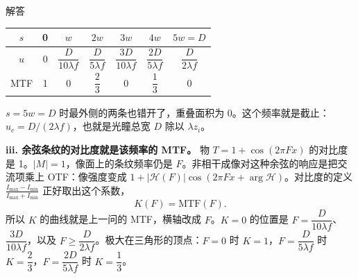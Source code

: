 \begin{exam}{解答}
\begin{center}\renewcommand{\arraystretch}{1.3}
\begin{tabular}{c|cccccc}
$s$ & 0 & $w$ & $2w$ & $3w$ & $4w$ & $5w=D$\\ \hline
$u$ & 0 & $\dfrac{D}{10\lambda f}$ & $\dfrac{D}{5\lambda f}$ & $\dfrac{3D}{10\lambda f}$ & $\dfrac{2D}{5\lambda f}$ & $\dfrac{D}{2\lambda f}$\\
MTF & 1 & 0 & $\dfrac23$ & 0 & $\dfrac13$ & 0
\end{tabular}
\end{center}
$s=5w=D$ 时最外侧的两条也错开了，重叠面积为 0。这个频率就是截止：$u_c=D/(2\lambda f)$，也就是光瞳总宽 $D$ 除以 $\lambda z_i$。

\textbf{iii. 余弦条纹的对比度就是该频率的 MTF。}
物 $T=1+\cos(2\pi Fx)$ 的对比度是 1。$|M|=1$，像面上的条纹频率仍是 $F$。非相干成像对这种余弦的响应是把交流项乘上 OTF：像强度变成 $1+|\mathcal H(F)|\cos(2\pi Fx+\arg\mathcal H)$。对比度的定义 $\frac{I_{\max}-I_{\min}}{I_{\max}+I_{\min}}$ 正好取出这个系数，
\[
K(F)=\mathrm{MTF}(F).
\]
所以 $K$ 的曲线就是上一问的 MTF，横轴改成 $F$。$K=0$ 的位置是 $F=\dfrac{D}{10\lambda f}$、$\dfrac{3D}{10\lambda f}$，以及 $F\ge\dfrac{D}{2\lambda f}$。极大在三角形的顶点：$F=0$ 时 $K=1$，$F=\dfrac{D}{5\lambda f}$ 时 $K=\dfrac23$，$F=\dfrac{2D}{5\lambda f}$ 时 $K=\dfrac13$。
\end{exam}

\begin{center}
\end{center}

